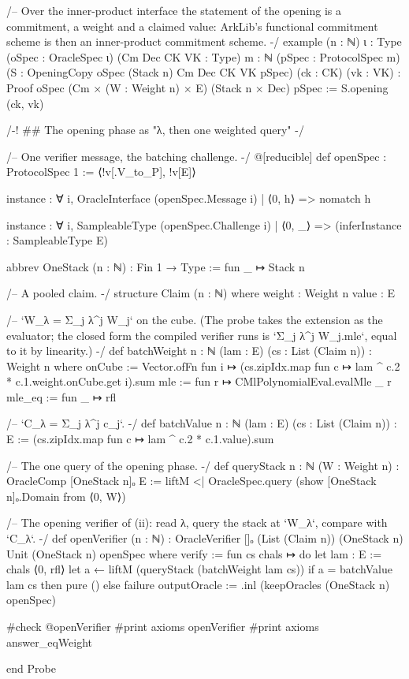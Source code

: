 \begin{leancode}
/-- Over the inner-product interface the statement of the opening is a commitment, a weight and
a claimed value: ArkLib's functional commitment scheme is then an inner-product commitment
scheme. -/
example (n : ℕ) {ι : Type} (oSpec : OracleSpec ι) (Cm Dec CK VK : Type) {m : ℕ}
    (pSpec : ProtocolSpec m)
    (S : OpeningCopy oSpec (Stack n) Cm Dec CK VK pSpec) (ck : CK) (vk : VK) :
    Proof oSpec (Cm × (W : Weight n) × E) (Stack n × Dec) pSpec :=
  S.opening (ck, vk)

/-! ## The opening phase as "λ, then one weighted query" -/

/-- One verifier message, the batching challenge. -/
@[reducible]
def openSpec : ProtocolSpec 1 := ⟨!v[.V_to_P], !v[E]⟩

instance : ∀ i, OracleInterface (openSpec.Message i)
  | ⟨0, h⟩ => nomatch h

instance : ∀ i, SampleableType (openSpec.Challenge i)
  | ⟨0, _⟩ => (inferInstance : SampleableType E)

abbrev OneStack (n : ℕ) : Fin 1 → Type := fun _ ↦ Stack n

/-- A pooled claim. -/
structure Claim (n : ℕ) where
  weight : Weight n
  value : E

/-- `W_λ = Σ_j λ^j W_j` on the cube. (The probe takes the extension as the evaluator; the closed
form the compiled verifier runs is `Σ_j λ^j W_j.mle`, equal to it by linearity.) -/
def batchWeight {n : ℕ} (lam : E) (cs : List (Claim n)) : Weight n where
  onCube := Vector.ofFn fun i ↦ (cs.zipIdx.map fun c ↦ lam ^ c.2 * c.1.weight.onCube.get i).sum
  mle := fun r ↦ CMlPolynomialEval.evalMle _ r
  mle_eq := fun _ ↦ rfl

/-- `C_λ = Σ_j λ^j c_j`. -/
def batchValue {n : ℕ} (lam : E) (cs : List (Claim n)) : E :=
  (cs.zipIdx.map fun c ↦ lam ^ c.2 * c.1.value).sum

/-- The one query of the opening phase. -/
def queryStack {n : ℕ} (W : Weight n) : OracleComp [OneStack n]ₒ E :=
  liftM <| OracleSpec.query (show [OneStack n]ₒ.Domain from ⟨0, W⟩)

/-- The opening verifier of (ii): read λ, query the stack at `W_λ`, compare with `C_λ`. -/
def openVerifier (n : ℕ) :
    OracleVerifier []ₒ (List (Claim n)) (OneStack n) Unit (OneStack n) openSpec where
  verify := fun cs chals ↦ do
    let lam : E := chals ⟨0, rfl⟩
    let a ← liftM (queryStack (batchWeight lam cs))
    if a = batchValue lam cs then pure () else failure
  outputOracle := .inl (keepOracles (OneStack n) openSpec)

#check @openVerifier
#print axioms openVerifier
#print axioms answer_eqWeight

end Probe
\end{leancode}

